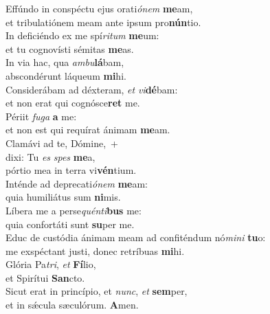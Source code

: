 \evenverse Effúndo in conspéctu ejus orati\textit{ó}\textit{nem} \textbf{me}am,~\*\\
\evenverse et tribulatiónem meam ante ipsum pro\textbf{nún}tio.\\
\oddverse In deficiéndo ex me spí\textit{ri}\textit{tum} \textbf{me}um:~\*\\
\oddverse et tu cognovísti sémitas \textbf{me}as.\\
\evenverse In via hac, qua \textit{am}\textit{bu}\textbf{lá}bam,~\*\\
\evenverse abscondérunt láqueum \textbf{mi}hi.\\
\oddverse Considerábam ad déxteram, \textit{et} \textit{vi}\textbf{dé}bam:~\*\\
\oddverse et non erat qui cognósce\textbf{ret} me.\\
\evenverse Périit \textit{fu}\textit{ga} \textbf{a} me:~\*\\
\evenverse et non est qui requírat ánimam \textbf{me}am.\\
\oddverse Clamávi ad te, Dómine,~+\\
\oddverse  dixi: Tu \textit{es} \textit{spes} \textbf{me}a,~\*\\
\oddverse pórtio mea in terra vi\textbf{vén}tium.\\
\evenverse Inténde ad deprecati\textit{ó}\textit{nem} \textbf{me}am:~\*\\
\evenverse quia humiliátus sum \textbf{ni}mis.\\
\oddverse Líbera me a perse\textit{quén}\textit{ti}\textbf{bus} me:~\*\\
\oddverse quia confortáti sunt \textbf{su}per me.\\
\evenverse Educ de custódia ánimam meam ad confiténdum nó\textit{mi}\textit{ni} \textbf{tu}o:~\*\\
\evenverse me exspéctant justi, donec retríbuas \textbf{mi}hi.\\
\oddverse Glória Pa\textit{tri}, \textit{et} \textbf{Fí}lio,~\*\\
\oddverse et Spirítui \textbf{San}cto.\\
\evenverse Sicut erat in princípio, et \textit{nunc}, \textit{et} \textbf{sem}per,~\*\\
\evenverse et in sǽcula sæculórum. \textbf{A}men.\\
